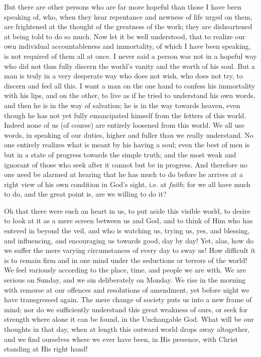 But there are other persons who are far more hopeful
than those I have been speaking of, who, when they hear
repentance and newness of life urged on them, are
frightened at the thought of the greatness of the work;
they are disheartened at being told to do so much. Now
let it be well understood, that to realize our own
individual accountableness and immortality, of which I
have been speaking, is not required of them all at once.
I never said a person was not in a hopeful way who did
not thus fully discern the world's vanity and the worth
of his soul. But a man is truly in a very desperate way
who does not wish, who does not try, to discern and feel
all this. I want a man on the one hand to confess his
immortality with his lips, and on the other, to live as if he tried to understand his own words, and then he is in
the way of salvation; he is in the way towards heaven,
even though he has not yet fully emancipated himself from
the fetters of this world. Indeed none of us (of course)
are entirely loosened from this world. We all use words,
in speaking of our duties, higher and fuller than we
really understand. No one entirely realizes what is meant
by his having a soul; even the best of men is but in a
state of progress towards the simple truth; and the most
weak and ignorant of those who seek after it cannot but
be in progress. And therefore no one need be alarmed at
hearing that he has much to do before he arrives at a
right view of his own condition in God's sight, i.e. at \emph{faith};
for we all have much to do, and the great point is, are
we willing to do it?

Oh that there were such an heart in us, to put aside
this visible world, to desire to look at it as a mere
screen between us and God, and to think of Him who has
entered in beyond the veil, and who is watching us,
trying us, yes, and blessing, and influencing, and
encouraging us towards good, day by day! Yet, alas, how
do we suffer the mere varying circumstances of every day
to sway us! How difficult it is to remain firm and in one
mind under the seductions or terrors of the world! We
feel variously according to the place, time, and people
we are with. We are serious on Sunday, and we sin
deliberately on Monday. We rise in the morning with
remorse at our offences and resolutions of amendment, yet
before night we have transgressed again. The mere change
of society puts us into a new frame of mind; nor do we
sufficiently understand this great weakness of ours, or
seek for strength where alone it can be found, in the
Unchangable God. What will be our thoughts in that day,
when at length this outward world drops away altogether,
and we find ourselves where we ever have been, in His
presence, with Christ standing at His right hand!

